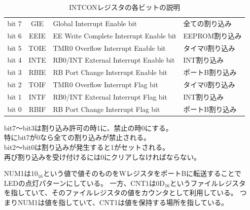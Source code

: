 \documentclass[a4paper,12pt]{ujarticle}
\begin{document}
    \begin{table}[htbp]
     \begin{center}
      \caption{INTCONレジスタの各ビットの説明}
      \label{INTCON-bit}
      \begin{tabular}{|c|c|l|l|}\hline
       bit 7&GIE&Global Interrupt Enable bit&全ての割り込み \\
       bit 6&EEIE&EE Write Complete Interrupt Enable bit&EEPROM割り込み \\
       bit 5&TOIE&TMR0 Overflow Interrupt Enable bit&タイマ0割り込み \\
       bit 4&INTE&RB0/INT External Interrupt Enable bit&INT割り込み \\
       bit 3&RBIE&RB Port Change Interrupt Enable bit&ポートB割り込み \\ \hline
       bit 2&TOIF&TMR0 Overflow Interrupt Flag bit&タイマ0割り込み \\
       bit 1&INTF&RB0/INT External Interrupt Flag bit&INT割り込み \\
       bit 0&RBIF&RB Port Change Interrupt Flag bit&ポートB割り込み \\ \hline
      \end{tabular}

      bit7〜bit3は割り込み許可の時1に、禁止の時0にする。\\
      特にbit7が0なら全ての割り込みが禁止される。\\
      bit2〜bit0は割り込みが発生すると1がセットされる。\\
      再び割り込みを受け付けるには0にクリアしなければならない。\\
     \end{center}
    \end{table}

    NUM1は10$_{16}$という値で値そのものをWレジスタをポートBに転送することでLEDの点灯パターンにしている。
    一方、CNT1は0D$_{16}$というファイルレジスタを指していて、そのファイルレジスタの値をカウンタとして利用している。
    つまりNUM1は値を指していて、CNT1は値を保持する場所を指している。
\end{document}
